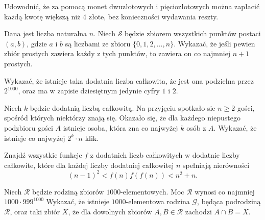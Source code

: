 \begin{problem}{1}
	Udowodnić, że za pomocą monet dwuzłotowych i pięciozłotowych można zapłacić każdą kwotę większą niż $4$ złote, bez konieczności wydawania reszty.
\end{problem}

\begin{problem}{2}
	Dana jest liczba naturalna $n$. Niech $\mathcal{S}$ będzie zbiorem wszystkich punktów postaci $(a, b)$, gdzie $a$ i $b$ są liczbami ze zbioru $\{0, 1, 2, ..., n\}$. Wykazać, że jeśli pewien zbiór prostych zawiera każdy z tych punktów, to zawiera on co najmniej $n + 1$ prostych. 
\end{problem}

\begin{problem}{3}
	Wykazać, że istnieje taka dodatnia liczba całkowita, że jest ona podzielna przez $2^{1000}$, oraz ma w zapisie dziesiętnym jedynie cyfry $1$ i $2$.
\end{problem}

\begin{problem}{4}
	Niech $k$ będzie dodatnią liczbą całkowitą. Na przyjęciu spotkało sie $n \geqslant 2$ gości, spośród których niektórzy znają się. Okazało się, że dla każdego niepustego podzbioru gości $A$ istnieje osoba, która zna co najwyżej $k$ osób z $A$. Wykazać, że istnieje co najwyżej $2^k \cdot n$ klik.
\end{problem}

\begin{problem}{5}
	Znajdź wszystkie funkcje $f$ z dodatnich liczb całkowitych w dodatnie liczby całkowite, które dla każdej liczby dodatniej całkowitej $n$ spełniają nierówności
	\[
		(n - 1)^2 < f(n)f(f(n)) < n^2 + n.
	\]
\end{problem}

\begin{problem}{6}
	Niech $\mathcal{R}$ będzie rodziną zbiorów $1000$-elementowych. Moc $\mathcal{R}$ wynosi co najmniej $1000 \cdot 999^{1000}$ Wykazać, że istnieje $1000$-elementowa rodzina $\mathcal{G}$, będąca podrodziną $\mathcal{R}$, oraz taki zbiór $X$, że dla dowolnych zbiorów $A, B \in \mathcal{R}$ zachodzi $A \cap B = X$.
\end{problem}

